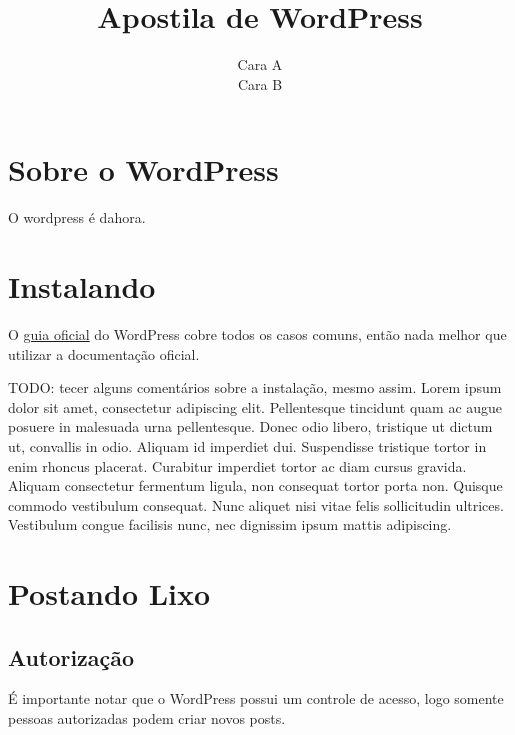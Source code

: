 \documentclass[12pt,onecolumn]{article}
\begin{document}
\title{Apostila de WordPress}
\author{Cara A \\ Cara B}
\maketitle

\section{Sobre o WordPress}
	O wordpress é dahora.

\section{Instalando}
	O \href{http://codex.wordpress.org/Installing_WordPress}{guia oficial} do 
	WordPress cobre todos os casos comuns, então nada melhor que utilizar a documentação oficial.
	
	TODO: tecer alguns comentários sobre a instalação, mesmo assim.
	Lorem ipsum dolor sit amet, consectetur adipiscing elit. Pellentesque tincidunt quam ac augue posuere in malesuada urna pellentesque. Donec odio libero, tristique ut dictum ut, convallis in odio. Aliquam id imperdiet dui. Suspendisse tristique tortor in enim rhoncus placerat. Curabitur imperdiet tortor ac diam cursus gravida. Aliquam consectetur fermentum ligula, non consequat tortor porta non. Quisque commodo vestibulum consequat. Nunc aliquet nisi vitae felis sollicitudin ultrices. Vestibulum congue facilisis nunc, nec dignissim ipsum mattis adipiscing. 

\section{Postando Lixo}

	\subsection{Autorização}
		É importante notar que o WordPress possui um controle de acesso, logo 
		somente pessoas autorizadas podem criar novos posts.
		
\end{document}
